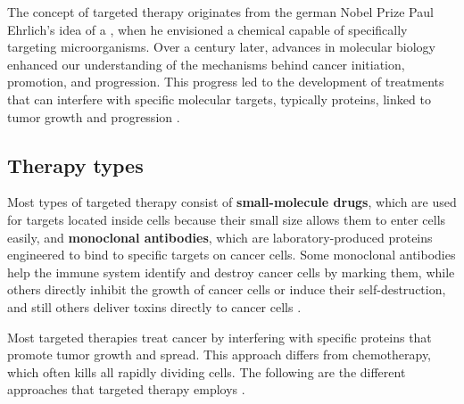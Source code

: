The concept of targeted therapy originates from the german Nobel Prize Paul Ehrlich's idea of a  \cite{ehrlich}, when he envisioned a chemical capable of specifically targeting microorganisms. Over a century later, advances in molecular biology enhanced our understanding of the mechanisms behind cancer initiation, promotion, and progression. This progress led to the development of treatments that can interfere with specific molecular targets, typically proteins, linked to tumor growth and progression \cite{se_tt}.

\subsection{Therapy types}

Most types of targeted therapy consist of \textbf{small-molecule drugs}, which are used for targets located inside cells because their small size allows them to enter cells easily, and \textbf{monoclonal antibodies}, which are laboratory-produced proteins engineered to bind to specific targets on cancer cells. Some monoclonal antibodies help the immune system identify and destroy cancer cells by marking them, while others directly inhibit the growth of cancer cells or induce their self-destruction, and still others deliver toxins directly to cancer cells \cite{target_therapy1}.

Most targeted therapies treat cancer by interfering with specific proteins that promote tumor growth and spread. This approach differs from chemotherapy, which often kills all rapidly dividing cells. The following are the different approaches that targeted therapy employs \cite{target_therapy1}.

